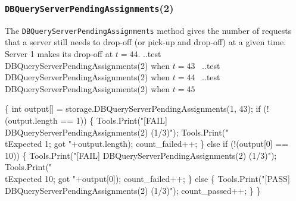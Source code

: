 \documentclass{article}
\def\nwendcode{\endtrivlist \endgroup}
\let\nwdocspar=\par
\begin{document}
\subsubsection{{\tt{}DBQueryServerPendingAssignments}(2)}
The {\tt{}DBQueryServerPendingAssignments} method gives the number of requests that
a server still needs to drop-off (or pick-up and drop-off) at a given time.
Server 1 makes its drop-off at $t=44$.
\nwenddocs{}\endmoddef{}
  \LA{}..test \code{}DBQueryServerPendingAssignments\edoc{}(2) when $t=43$~{\nwtagstyle{}}\RA{}
  \LA{}..test \code{}DBQueryServerPendingAssignments\edoc{}(2) when $t=44$~{\nwtagstyle{}}\RA{}
  \LA{}..test \code{}DBQueryServerPendingAssignments\edoc{}(2) when $t=45$~{\nwtagstyle{}}\RA{}
\nwendcode{}\nwdocspar
\nwenddocs{}\endmoddef{}
\{
  int output[] = storage.DBQueryServerPendingAssignments(1, 43);
  if (!(output.length == 1)) \{
    Tools.Print("[FAIL] DBQueryServerPendingAssignments(2) (1/3)");
    Tools.Print("\\tExpected 1; got "+output.length);
    count_failed++;
  \} else if (!(output[0] == 10)) \{
    Tools.Print("[FAIL] DBQueryServerPendingAssignments(2) (1/3)");
    Tools.Print("\\tExpected 10; got "+output[0]);
    count_failed++;
  \} else \{
    Tools.Print("[PASS] DBQueryServerPendingAssignments(2) (1/3)");
    count_passed++;
  \}
\}
\nwendcode{}\nwdocspar
\nwenddocs{}\endmoddef{}
\end{document}
